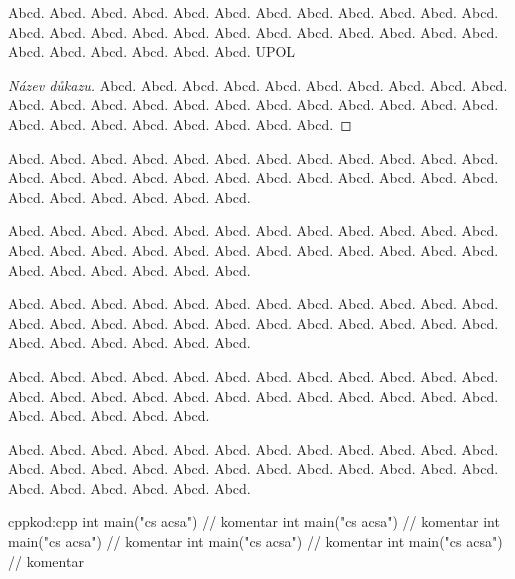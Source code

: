 \documentclass[
  field=inf,
  biblatex,
  glossaries,
  index
]{kidiplom}
\begin{document}

\begin{definition}
Abcd. Abcd. Abcd. Abcd. Abcd. Abcd. Abcd. Abcd. Abcd. Abcd. Abcd. Abcd. Abcd. Abcd. Abcd. Abcd. Abcd. Abcd. Abcd. Abcd. Abcd. Abcd. Abcd. Abcd. Abcd. Abcd. Abcd. Abcd. Abcd. Abcd. \gls{UPOL}
\end{definition}

\begin{proof}[Název důkazu]
Abcd. Abcd. Abcd. Abcd. Abcd. Abcd. Abcd. Abcd. Abcd. Abcd. Abcd. Abcd. Abcd. Abcd. Abcd. Abcd. Abcd. Abcd. Abcd. Abcd. Abcd. Abcd. Abcd. Abcd. Abcd. Abcd. Abcd. Abcd. Abcd. Abcd. 
\end{proof}

\begin{remark}
Abcd. Abcd. Abcd. Abcd. Abcd. Abcd. Abcd. Abcd. Abcd. Abcd. Abcd. Abcd. Abcd. Abcd. Abcd. Abcd. Abcd. Abcd. Abcd. Abcd. Abcd. Abcd. Abcd. Abcd. Abcd. Abcd. Abcd. Abcd. Abcd. Abcd. 
\end{remark}

\begin{example}
Abcd. Abcd. Abcd. Abcd. Abcd. Abcd. Abcd. Abcd. Abcd. Abcd. Abcd. Abcd. Abcd. Abcd. Abcd. Abcd. Abcd. Abcd. Abcd. Abcd. Abcd. Abcd. Abcd. Abcd. Abcd. Abcd. Abcd. Abcd. Abcd. Abcd. 
\end{example}

\begin{lemma}
Abcd. Abcd. Abcd. Abcd. Abcd. Abcd. Abcd. Abcd. Abcd. Abcd. Abcd. Abcd. Abcd. Abcd. Abcd. Abcd. Abcd. Abcd. Abcd. Abcd. Abcd. Abcd. Abcd. Abcd. Abcd. Abcd. Abcd. Abcd. Abcd. Abcd. 
\end{lemma}

\begin{consequence}
Abcd. Abcd. Abcd. Abcd. Abcd. Abcd. Abcd. Abcd. Abcd. Abcd. Abcd. Abcd. Abcd. Abcd. Abcd. Abcd. Abcd. Abcd. Abcd. Abcd. Abcd. Abcd. Abcd. Abcd. Abcd. Abcd. Abcd. Abcd. Abcd. 
\end{consequence}

\begin{theorem}
Abcd. Abcd. Abcd. Abcd. Abcd. Abcd. Abcd. Abcd. Abcd. Abcd. Abcd. Abcd. Abcd. Abcd. Abcd. Abcd. Abcd. Abcd. Abcd. Abcd. Abcd. Abcd. Abcd. Abcd. Abcd. Abcd. Abcd. Abcd. Abcd. Abcd. 
\end{theorem}


\begin{kicode}{cpp}{kod:cpp}{\cpp}
int main("cs acsa") // komentar
int main("cs acsa") // komentar
int main("cs acsa") // komentar
int main("cs acsa") // komentar
int main("cs acsa") // komentar
\end{kicode}
\end{document}
